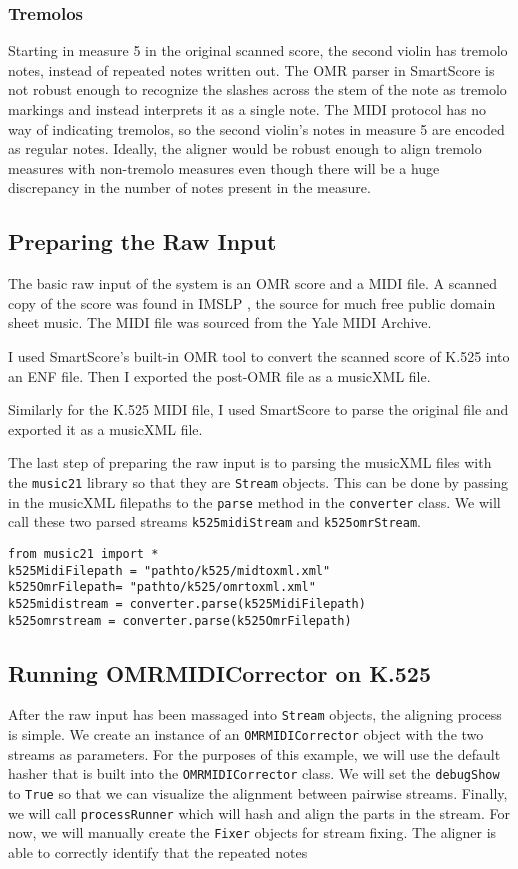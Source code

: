 \subsubsection{Tremolos}
Starting in measure 5 in the original scanned score, the second violin has tremolo notes, instead of repeated  notes written out. The OMR parser in SmartScore is not robust enough to recognize the slashes across the stem of the note as tremolo markings and instead interprets it as a single note. The MIDI protocol has no way of indicating tremolos, so the second violin's notes in measure 5 are encoded as regular  notes. Ideally, the aligner would be robust enough to align tremolo measures with non-tremolo measures even though there will be a huge discrepancy in the number of notes present in the measure.

\subsection{Preparing the Raw Input}
The basic raw input of the system is an OMR score and a MIDI file. A scanned copy of the score was found in IMSLP \cite{k525}, the source for much free public domain sheet music. The MIDI file was sourced from the Yale MIDI Archive. 

I used SmartScore's built-in OMR tool to convert the scanned score of K.525 into an ENF file. Then I exported the post-OMR file as a musicXML file.

Similarly for the K.525 MIDI file, I used SmartScore to parse the original file and exported it as a musicXML file. 

The last step of preparing the raw input is to parsing the musicXML files with the \texttt{music21} library so that they are \texttt{Stream} objects. This can be done by passing in the musicXML filepaths to the \texttt{parse} method in the \texttt{converter} class. We will call these two parsed streams \texttt{k525midiStream} and \texttt{k525omrStream}. 
\begin{verbatim}
from music21 import *
k525MidiFilepath = "pathto/k525/midtoxml.xml"
k525OmrFilepath= "pathto/k525/omrtoxml.xml"
k525midistream = converter.parse(k525MidiFilepath)
k525omrstream = converter.parse(k525OmrFilepath)
\end{verbatim}
\subsection{Running OMRMIDICorrector on K.525}
After the raw input has been massaged into \texttt{Stream} objects, the aligning process is simple. We create an instance of an \texttt{OMRMIDICorrector} object with the two streams as parameters. For the purposes of this example, we will use the default hasher that is built into the \texttt{OMRMIDICorrector} class. We will set the \texttt{debugShow} to \texttt{True} so that we can visualize the alignment between pairwise streams. Finally, we will call \texttt{processRunner} which will hash and align the parts in the stream. For now, we will manually create the \texttt{Fixer} objects for stream fixing. The aligner is able to correctly identify that the repeated  notes 

